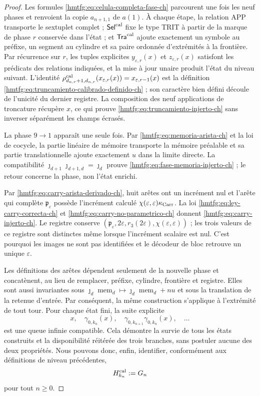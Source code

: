 \begin{proof}
Les formules \eqref{hmtfg:eq:celula-completa-fase-ch} parcourent une fois les neuf phases et renvoient la copie \(a_{n+1,1}\) de \(a(1)\). À chaque étape, la relation APP transporte le sextuplet complet ; \(\mathsf{Sel}^{\rm cal}\) fixe le type TRIT à partir de la marque de phase \(r\) conservée dans l'état ; et \(\mathsf{Tra}^{\rm cal}\) ajoute exactement un symbole au préfixe, un segment au cylindre et sa paire ordonnée d'extrémités à la frontière. Par récurrence sur \(r\), les tuples explicites \(y_{\varepsilon,r}(x)\) et \(z_{\varepsilon,r}(x)\) satisfont les prédicats des relations indiquées, et la mise à jour unaire produit l'état du niveau suivant. L'identité \(\rho^{\rm cal}_{d_{n,r}+1,d_{n,r}}
(x_{\varepsilon,r}(x))=x_{\varepsilon,r-1}(x)\) est la définition \eqref{hmtfg:eq:truncamiento-calibrado-definido-ch} ; son caractère bien défini découle de l'unicité du dernier registre. La composition des neuf applications de troncature récupère \(x\), ce qui prouve \eqref{hmtfg:eq:truncamiento-injerto-ch} sans inverser séparément les champs écrasés.

La phase \(9\to1\) apparaît une seule fois. Par
\eqref{hmtfg:eq:memoria-arista-ch} et la loi de cocycle, la partie linéaire de mémoire
transporte la mémoire préalable et sa partie translationnelle ajoute exactement \(u\)
dans la limite directe. La compatibilité
\(\jmath_{d+1}\jmath_{d+1,d}=\jmath_d\) prouve
\eqref{hmtfg:eq:fase-memoria-injerto-ch} ; le retour concerne la phase, non
l’état enrichi.

Par \eqref{hmtfg:eq:carry-arista-derivado-ch}, huit arêtes ont un incrément nul et
l’arête qui complète \(\mathfrak p_\varepsilon\) possède l’incrément calculé
\(\chi(\varepsilon,\varepsilon)\kappa_{\rm Carr}\). La loi
\eqref{hmtfg:eq:ley-carry-correcta-ch} et
\eqref{hmtfg:eq:carry-no-parametrico-ch} donnent
\eqref{hmtfg:eq:carry-injerto-ch}. Le registre conserve
\((\mathfrak p_\varepsilon,2\varepsilon,r_3(2\varepsilon),
\chi(\varepsilon,\varepsilon))\) ; les trois valeurs de ce registre sont
distinctes même lorsque l’incrément scalaire est nul. C’est pourquoi les images
ne sont pas identifiées et le décodeur de bloc retrouve un unique
\(\varepsilon\).

Les définitions des arêtes dépendent seulement de la nouvelle phase et concatènent,
au lieu de remplacer, préfixe, cylindre, frontière et registre. Elles sont aussi
invariantes sous
\(\jmath_d\operatorname{mem}_d\mapsto
  \jmath_d\operatorname{mem}_d+nu\)
et sous la translation de la retenue
d’entrée. Par conséquent, la même construction s’applique à l’extrémité de
tout tour. Pour chaque état fini, la suite explicite
\[
 x,\quad\gamma_{0,k_n}(x),\quad
 \gamma_{0,k_{n+1}}\gamma_{0,k_n}(x),\quad\ldots
\]
est une queue infinie compatible. Cela démontre la survie de tous les
états construits et la disponibilité réitérée des trois branches, sans
postuler aucune des deux propriétés. Nous pouvons donc, enfin,
identifier, conformément aux définitions de niveau précédentes,
\begin{equation}
 H_{k_n}^{\rm cal}:=G_n
 \label{hmtfg:eq:subarbol-calibrado-superviviente-ch}
\end{equation}
pour tout \(n\ge0\).
\end{proof}

